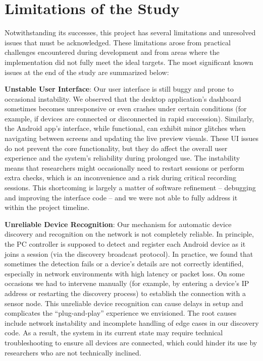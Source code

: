 \section{Limitations of the Study}

Notwithstanding its successes, this project has several limitations and unresolved issues that must be acknowledged. These limitations arose from practical challenges encountered during development and from areas where the implementation did not fully meet the ideal targets. The most significant known issues at the end of the study are summarized below:

\textbf{Unstable User Interface}: Our user interface is still buggy and prone to occasional instability. We observed that the desktop application's dashboard sometimes becomes unresponsive or even crashes under certain conditions (for example, if devices are connected or disconnected in rapid succession). Similarly, the Android app's interface, while functional, can exhibit minor glitches when navigating between screens and updating the live preview visuals. These UI issues do not prevent the core functionality, but they do affect the overall user experience and the system's reliability during prolonged use. The instability means that researchers might occasionally need to restart sessions or perform extra checks, which is an inconvenience and a risk during critical recording sessions. This shortcoming is largely a matter of software refinement -- debugging and improving the interface code -- and we were not able to fully address it within the project timeline.

\textbf{Unreliable Device Recognition}: Our mechanism for automatic device discovery and recognition on the network is not completely reliable. In principle, the PC controller is supposed to detect and register each Android device as it joins a session (via the discovery broadcast protocol). In practice, we found that sometimes the detection fails or a device's details are not correctly identified, especially in network environments with high latency or packet loss. On some occasions we had to intervene manually (for example, by entering a device's IP address or restarting the discovery process) to establish the connection with a sensor node. This unreliable device recognition can cause delays in setup and complicates the ``plug-and-play'' experience we envisioned. The root causes include network instability and incomplete handling of edge cases in our discovery code. As a result, the system in its current state may require technical troubleshooting to ensure all devices are connected, which could hinder its use by researchers who are not technically inclined.

